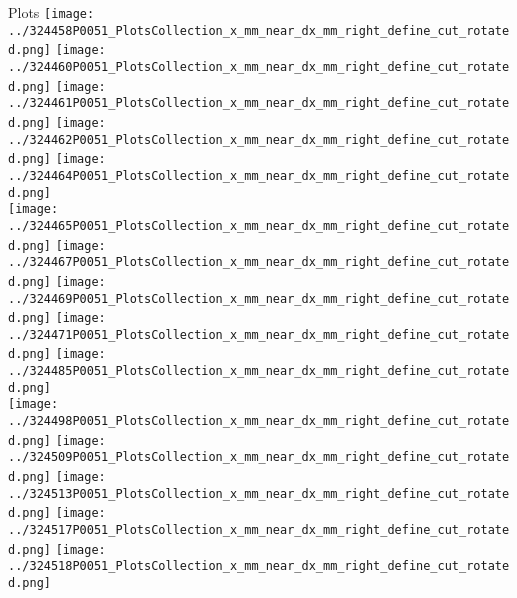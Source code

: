 \documentclass{beamer}
\begin{document}
\begin{frame}\tiny
        \begin{block}{Plots}
		  \centering
                \texttt{[image: ../324458P0051\_PlotsCollection\_x\_mm\_near\_dx\_mm\_right\_define\_cut\_rotated.png]}
                \texttt{[image: ../324460P0051\_PlotsCollection\_x\_mm\_near\_dx\_mm\_right\_define\_cut\_rotated.png]}
                \texttt{[image: ../324461P0051\_PlotsCollection\_x\_mm\_near\_dx\_mm\_right\_define\_cut\_rotated.png]}
                \texttt{[image: ../324462P0051\_PlotsCollection\_x\_mm\_near\_dx\_mm\_right\_define\_cut\_rotated.png]}
                \texttt{[image: ../324464P0051\_PlotsCollection\_x\_mm\_near\_dx\_mm\_right\_define\_cut\_rotated.png]}\\
                \texttt{[image: ../324465P0051\_PlotsCollection\_x\_mm\_near\_dx\_mm\_right\_define\_cut\_rotated.png]}
                \texttt{[image: ../324467P0051\_PlotsCollection\_x\_mm\_near\_dx\_mm\_right\_define\_cut\_rotated.png]}
                \texttt{[image: ../324469P0051\_PlotsCollection\_x\_mm\_near\_dx\_mm\_right\_define\_cut\_rotated.png]}
                \texttt{[image: ../324471P0051\_PlotsCollection\_x\_mm\_near\_dx\_mm\_right\_define\_cut\_rotated.png]}
                \texttt{[image: ../324485P0051\_PlotsCollection\_x\_mm\_near\_dx\_mm\_right\_define\_cut\_rotated.png]}\\
                \texttt{[image: ../324498P0051\_PlotsCollection\_x\_mm\_near\_dx\_mm\_right\_define\_cut\_rotated.png]}
                \texttt{[image: ../324509P0051\_PlotsCollection\_x\_mm\_near\_dx\_mm\_right\_define\_cut\_rotated.png]}
                \texttt{[image: ../324513P0051\_PlotsCollection\_x\_mm\_near\_dx\_mm\_right\_define\_cut\_rotated.png]}
                \texttt{[image: ../324517P0051\_PlotsCollection\_x\_mm\_near\_dx\_mm\_right\_define\_cut\_rotated.png]}
                \texttt{[image: ../324518P0051\_PlotsCollection\_x\_mm\_near\_dx\_mm\_right\_define\_cut\_rotated.png]}\\

\end{block}
\end{frame}
\end{document}
